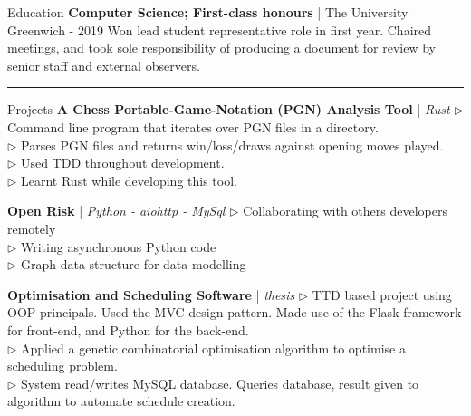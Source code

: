 \documentclass[12pt,twoside]{article}
\begin{document}
\headedsection
    {Education}
    {
        \textbf{Computer Science; First-class honours} | The University
        Greenwich - 2019
    }
    {
        Won lead student representative role in first year. Chaired meetings,
        and took sole responsibility of producing a document for review by
        senior staff and external observers.
    }

\vspace{1.0em}
\hrule
\vspace{1.0em}

\headedsection
    {Projects}
    {\textbf{A Chess Portable-Game-Notation (PGN) Analysis Tool} | \textit{Rust}}
    {
        $\triangleright$ Command line program that iterates over PGN files in a
        directory. \\
        $\triangleright$ Parses PGN files and returns win/loss/draws against
        opening moves played. \\
        $\triangleright$ Used TDD throughout development. \\
        $\triangleright$ Learnt Rust while developing this tool.
    }

\vspace{0.2em}

\headedsection
    {}
    {\textbf{Open Risk} | \textit{Python - aiohttp - MySql}}
    {
        $\triangleright$ Collaborating with others developers remotely \\
        $\triangleright$ Writing asynchronous Python code \\
        $\triangleright$ Graph data structure for data modelling
    }

\vspace{0.2em}

\headedsection
    {}
    {\textbf{Optimisation and Scheduling Software} | \textit{thesis}}
    {
        $\triangleright$ TTD based project using OOP principals. Used the MVC
        design pattern. Made use of the Flask framework for front-end, and
        Python for the back-end. \\
        $\triangleright$ Applied a genetic combinatorial optimisation algorithm
        to optimise a scheduling problem. \\
        $\triangleright$ System read/writes MySQL database. Queries database,
        result given to algorithm to automate schedule creation.
    }

\end{document}
